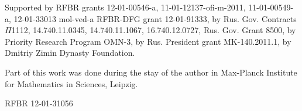 Supported by RFBR grants 12-01-00546-a, 11-01-12137-ofi-m-2011, 11-01-00549-a, 12-01-33013 mol-ved-a 
RFBR-DFG grant 12-01-91333, by Rus. Gov. Contracts $\Pi$1112, 14.740.11.0345, 14.740.11.1067, 16.740.12.0727,
Rus. Gov. Grant 8500,  by Priority Research Program OMN-3,                                                                                                                                                                                                                         %
by Rus. President grant MK-140.2011.1, by Dmitriy Zimin Dynasty
Foundation. %

Part of this work was done during the stay of the author
in Max-Planck Institute for Mathematics in Sciences, Leipzig. %

RFBR 12-01-31056 %



